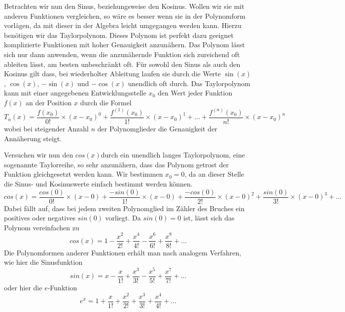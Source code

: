 \documentclass[a4paper,12pt]{article} %
\begin{document}
Betrachten wir nun den Sinus, beziehungsweise den Kosinus.
Wollen wir sie mit anderen Funktionen vergleichen, so wäre es besser wenn sie in der Polynomform vorlägen, da mit dieser in der Algebra leicht umgegangen werden kann.
Hierzu benötigen wir das Taylorpolynom.
Dieses Polynom ist perfekt dazu geeignet komplizierte Funktionen mit hoher Genauigkeit anzunähern.
Das Polynom lässt sich nur dann anwenden, wenn die anzunähernde Funktion sich zureichend oft ableiten lässt, am besten unbeschränkt oft.
Für sowohl den Sinus als auch den Kosinus gilt dass, bei wiederholter Ableitung laufen sie durch die Werte $\sin(x)$, $\cos(x)$, $-\sin(x)$ und $-\cos(x)$ unendlich oft durch.
Das Taylorpolynom kann mit einer angegebenen Entwicklungsstelle $x_0$ den Wert jeder Funktion $f(x)$ an der Position $x$ durch die Formel
\begin{equation}
	T_n(x)=\frac{f(x_0)}{0!}\times(x-x_0)^0 + \frac{f^{(1)}(x_0)}{1!}\times(x-x_0)^1 +%
	\dots +\frac{f^{(n)}(x_0)}{n!}\times(x-x_0)^n
\end{equation} %
wobei bei steigender Anzahl $n$ der Polynomglieder die Genauigkeit der Annäherung steigt.

Versuchen wir nun den $cos(x)$durch ein unendlich langes Taylorpolynom, eine sogenannte Taylorreihe, so sehr anzunähern, dass das Polynom getrost der Funktion gleichgesetzt werden kann.
Wir bestimmen $x_0=0$, da an dieser Stelle die Sinus- und Kosinuswerte einfach bestimmt werden können.
\[cos(x)=\frac{cos(0)}{0!}\times(x-0) + \frac{-sin(0)}{1!}\times(x-0) + \frac{-cos(0)}{2!}\times(x-0)^2+\frac{sin(0)}{3!}\times(x-0)^3+\dots\]
Dabei fällt auf, dass bei jedem zweiten Polynomglied im Zähler des Bruches ein positives oder negatives $sin(0)$ vorliegt.
Da $sin(0)=0$ ist, lässt sich das Polynom vereinfachen zu
\[cos(x)=1-\frac{x^2}{2!}+\frac{x^4}{4!}-\frac{x^6}{6!}+\frac{x^8}{8!}+\dots\]
Die Polynomformen anderer Funktionen erhält man nach analogem Verfahren, wie hier die Sinusfunktion
\[sin(x)=x-\frac{x}{1!}+\frac{x^3}{3!}-\frac{x^5}{5!}+\frac{x^7}{7!}+\dots\]
oder hier die $e$-Funktion
\[e^x=1+\frac{x}{1!}+\frac{x^2}{2!}+\frac{x^3}{3!}+\frac{x^4}{4!}+\dots\]
\end{document}

